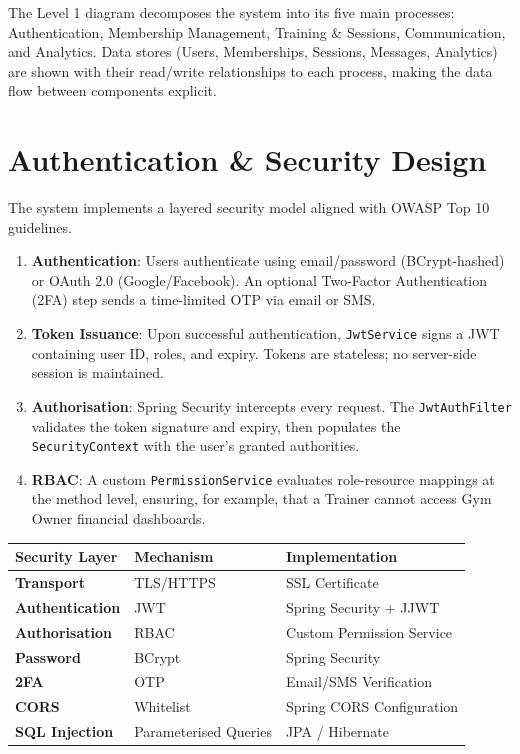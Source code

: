 \documentclass[
  12pt,
  a4paperpaper,
]{report}
\newcounter{none} %
\begin{document}
\smallskip\noindent
The Level 1 diagram decomposes the system into its five main processes: Authentication, Membership Management, Training \& Sessions, Communication, and Analytics. Data stores (Users, Memberships, Sessions, Messages, Analytics) are shown with their read/write relationships to each process, making the data flow between components explicit.


\section{Authentication \& Security Design}\label{authentication-security-design}

The system implements a layered security model aligned with OWASP Top 10 guidelines.

\begin{enumerate}
\def\labelenumi{\arabic{enumi}.}
\item \textbf{Authentication}: Users authenticate using email/password (BCrypt-hashed) or OAuth 2.0 (Google/Facebook). An optional Two-Factor Authentication (2FA) step sends a time-limited OTP via email or SMS.
\item \textbf{Token Issuance}: Upon successful authentication, \texttt{JwtService} signs a JWT containing user ID, roles, and expiry. Tokens are stateless; no server-side session is maintained.
\item \textbf{Authorisation}: Spring Security intercepts every request. The \texttt{JwtAuthFilter} validates the token signature and expiry, then populates the \texttt{SecurityContext} with the user's granted authorities.
\item \textbf{RBAC}: A custom \texttt{PermissionService} evaluates role-resource mappings at the method level, ensuring, for example, that a Trainer cannot access Gym Owner financial dashboards.
\end{enumerate}

{\def\LTcaptype{none}
\begin{longtable}[]{@{}lll@{}}
\hline
Security Layer & Mechanism & Implementation \\
\hline
\endhead
\hline
\endlastfoot
\textbf{Transport} & TLS/HTTPS & SSL Certificate \\
\textbf{Authentication} & JWT & Spring Security + JJWT \\
\textbf{Authorisation} & RBAC & Custom Permission Service \\
\textbf{Password} & BCrypt & Spring Security \\
\textbf{2FA} & OTP & Email/SMS Verification \\
\textbf{CORS} & Whitelist & Spring CORS Configuration \\
\textbf{SQL Injection} & Parameterised Queries & JPA / Hibernate \\
\end{longtable}
}
\end{document}
